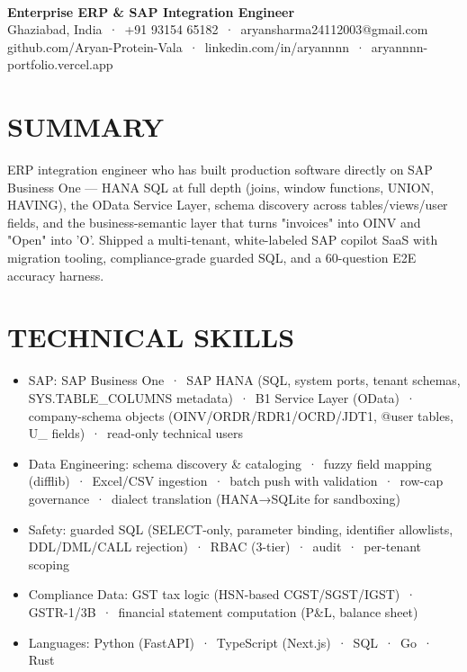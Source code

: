 \documentclass[9pt]{article}
\begin{document}
\\[3pt]
{\large\bfseries Enterprise ERP \& SAP Integration Engineer}\\[3pt]
{\small\color{greyc} Ghaziabad, India \,·\, +91 93154 65182 \,·\, aryansharma24112003@gmail.com}\vspace{-2pt}
{\small\color{greyc} github.com/Aryan-Protein-Vala \,·\, linkedin.com/in/aryannnn \,·\, aryannnn-portfolio.vercel.app}\vspace{-2pt}
\section*{SUMMARY}
ERP integration engineer who has built production software directly on SAP Business One  ---  HANA SQL at full depth (joins, window functions, UNION, HAVING), the OData Service Layer, schema discovery across tables/views/user fields, and the business-semantic layer that turns "invoices" into OINV and "Open" into 'O'. Shipped a multi-tenant, white-labeled SAP copilot SaaS with migration tooling, compliance-grade guarded SQL, and a 60-question E2E accuracy harness.
\vspace{1pt}
\section*{TECHNICAL SKILLS}
\begin{itemize}[leftmargin=11pt,itemsep=0pt,topsep=1pt,parsep=0pt]
\item SAP: SAP Business One \,·\, SAP HANA (SQL, system ports, tenant schemas, SYS.TABLE\_COLUMNS metadata) \,·\, B1 Service Layer (OData) \,·\, company-schema objects (OINV/ORDR/RDR1/OCRD/JDT1, @user tables, U\_ fields) \,·\, read-only technical users
\item Data Engineering: schema discovery \& cataloging \,·\, fuzzy field mapping (difflib) \,·\, Excel/CSV ingestion \,·\, batch push with validation \,·\, row-cap governance \,·\, dialect translation (HANA→SQLite for sandboxing)
\item Safety: guarded SQL (SELECT-only, parameter binding, identifier allowlists, DDL/DML/CALL rejection) \,·\, RBAC (3-tier) \,·\, audit \,·\, per-tenant scoping
\item Compliance Data: GST tax logic (HSN-based CGST/SGST/IGST) \,·\, GSTR-1/3B \,·\, financial statement computation (P\&L, balance sheet)
\item Languages: Python (FastAPI) \,·\, TypeScript (Next.js) \,·\, SQL \,·\, Go \,·\, Rust
\end{itemize}
\end{document}
